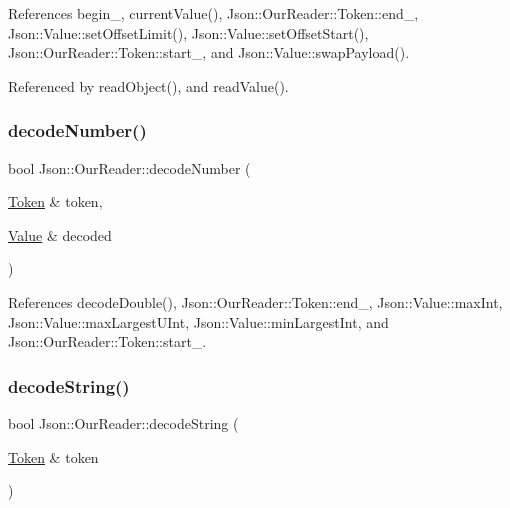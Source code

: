 References begin\+\_\+, current\+Value(), Json\+::\+Our\+Reader\+::\+Token\+::end\+\_\+, Json\+::\+Value\+::set\+Offset\+Limit(), Json\+::\+Value\+::set\+Offset\+Start(), Json\+::\+Our\+Reader\+::\+Token\+::start\+\_\+, and Json\+::\+Value\+::swap\+Payload().



Referenced by read\+Object(), and read\+Value().

\mbox{\label{classJson_1_1OurReader_a712270d53a2f023c2f406ac813548340_a712270d53a2f023c2f406ac813548340}} 
\subsubsection{\texorpdfstring{decode\+Number()}{decodeNumber()}\hspace{0.1cm}{\footnotesize\ttfamily [2/2]}}
{\footnotesize\ttfamily bool Json\+::\+Our\+Reader\+::decode\+Number (\begin{DoxyParamCaption}\item[{\hyperlink{classJson_1_1OurReader_1_1Token}{Token} \&}]{token,  }\item[{\hyperlink{classJson_1_1Value}{Value} \&}]{decoded }\end{DoxyParamCaption})\hspace{0.3cm}{\ttfamily [private]}}



References decode\+Double(), Json\+::\+Our\+Reader\+::\+Token\+::end\+\_\+, Json\+::\+Value\+::max\+Int, Json\+::\+Value\+::max\+Largest\+U\+Int, Json\+::\+Value\+::min\+Largest\+Int, and Json\+::\+Our\+Reader\+::\+Token\+::start\+\_\+.

\mbox{\label{classJson_1_1OurReader_a34e31d8b8399b7ad493359702b6de6c9_a34e31d8b8399b7ad493359702b6de6c9}} 
\subsubsection{\texorpdfstring{decode\+String()}{decodeString()}\hspace{0.1cm}{\footnotesize\ttfamily [1/2]}}
{\footnotesize\ttfamily bool Json\+::\+Our\+Reader\+::decode\+String (\begin{DoxyParamCaption}\item[{\hyperlink{classJson_1_1OurReader_1_1Token}{Token} \&}]{token }\end{DoxyParamCaption})\hspace{0.3cm}{\ttfamily [private]}}



